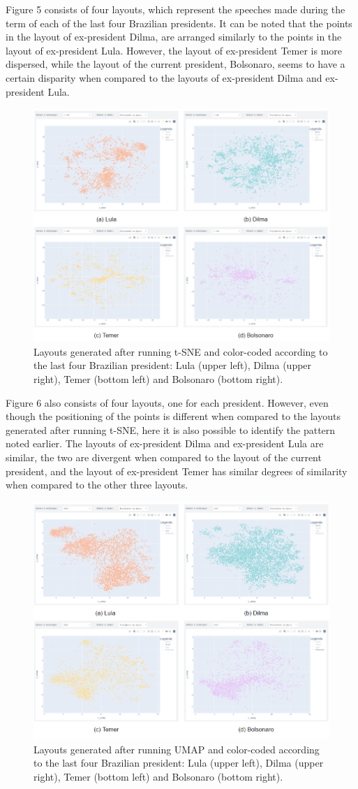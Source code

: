 \documentclass[conference]{IEEEtran}
\begin{document}
Figure 5 consists of four layouts, which represent the speeches made during the term of each of the last four Brazilian presidents. It can be noted that the points in the layout of ex-president Dilma, are arranged similarly to the points in the layout of ex-president Lula. However, the layout of ex-president Temer is more dispersed, while the layout of the current president, Bolsonaro, seems to have a certain disparity when compared to the layouts of ex-president Dilma and ex-president Lula.

\begin{figure}[htbp]
\centering
\includegraphics[width=.4\textwidth]{presidentes_tsne.png}
\caption{Layouts generated after running t-SNE and color-coded according to the last four Brazilian president: Lula (upper left), Dilma (upper right), Temer (bottom left) and Bolsonaro (bottom right).}
\label{fig}
\end{figure}

Figure 6 also consists of four layouts, one for each president. However, even though the positioning of the points is different when compared to the layouts generated after running t-SNE, here it is also possible to identify the pattern noted earlier. The layouts of ex-president Dilma and ex-president Lula are similar, the two are divergent when compared to the layout of the current president, and the layout of ex-president Temer has similar degrees of similarity when compared to the other three layouts.

\begin{figure}[htbp]
\centering
\includegraphics[width=.4\textwidth]{presidentes_umap.png}
\caption{Layouts generated after running UMAP and color-coded according to the last four Brazilian president: Lula (upper left), Dilma (upper right), Temer (bottom left) and Bolsonaro (bottom right).}
\label{fig}
\end{figure}
\end{document}
